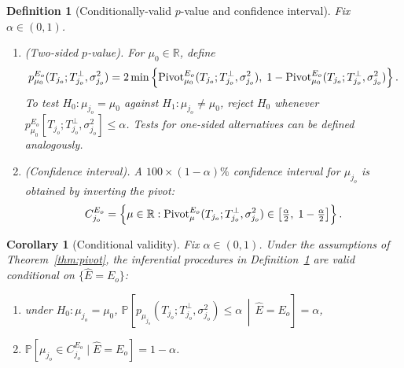 \documentclass[12pt]{article}
\newcommand{\Pivot}{\text{\normalfont Pivot}}
\newcommand{\cbracket}[1]{\left\{ #1 \right\}}
\newcommand{\rbracket}[1]{\left[ #1 \right]}
\newtheorem{definition}{Definition}[section]
\newtheorem{corollary}{Corollary}[section]
\newcommand{\real}{\mathbb{R}}
\newcommand{\Pp}{{\mathbb{P}}}
\newcommand{\Ehat}{\widehat{E}}
\begin{document}
\begin{definition}[Conditionally-valid $p$-value and confidence interval]
\label{def:selective-inference}
Fix $\alpha \in (0,1)$.
\begin{enumerate}
  \item \emph{(Two-sided $p$-value)}. For $\mu_0 \in \real$, define
  \[
    p^{E_o}_{\mu_0}(T_{j_o}; T_{j_o}^\perp, \sigma_{j_o}^2)
    =
    2\min\cbracket{
      \Pivot^{E_o}_{\mu_0}(T_{j_o}; T_{j_o}^\perp, \sigma_{j_o}^2),\;
      1 - \Pivot^{E_o}_{\mu_0}(T_{j_o}; T_{j_o}^\perp, \sigma_{j_o}^2)
    }.
  \]
  To test $H_0 : \mu_{j_o} = \mu_0$ against $H_1 : \mu_{j_o} \neq \mu_0$,
  reject $H_0$ whenever
  $p^{E_o}_{\mu_0}\rbracket{T_{j_o}; T_{j_o}^\perp, \sigma_{j_o}^2} \leq \alpha$. 
  Tests for one-sided alternatives can be defined analogously.
  \item \emph{(Confidence interval)}. A $100\times (1-\alpha)\%$ 
  confidence interval for $\mu_{j_o}$ is obtained by inverting the pivot:
  \[
    C^{E_o}_{j_o}
    =
    \cbracket{
      \mu \in \real :
      \Pivot^{E_o}_{\mu}(T_{j_o}; T_{j_o}^\perp, \sigma_{j_o}^2)
      \in
      \rbracket{\tfrac{\alpha}{2},\; 1 - \tfrac{\alpha}{2}}
    }.
  \]
\end{enumerate}
\end{definition}

\begin{corollary}[Conditional validity]
\label{cor:conditional-validity}
Fix $\alpha \in (0,1)$. Under the assumptions of Theorem~\ref{thm:pivot}, the
inferential procedures in Definition~\ref{def:selective-inference} are valid
conditional on $\{\Ehat = E_o\}$:
\begin{enumerate}[label=(\roman*),topsep=2pt,itemsep=2pt,leftmargin=*]
  \item under $H_0 : \mu_{j_o} = \mu_0$, \;
  $\mathbb{P}\!\left[
p_{\mu_{j_o}}(T_{j_o};T_{j_o}^\perp,\sigma_{j_o}^2) \leq \alpha
\,\middle|\, \widehat{E}=E_o
\right]= \alpha$,
  \item $ \Pp\!\left[
      \mu_{j_o} \in C^{E_o}_{j_o}
      \mid \Ehat = E_o\right]
    = 1-\alpha$.
\end{enumerate}
\end{corollary}
\end{document}
